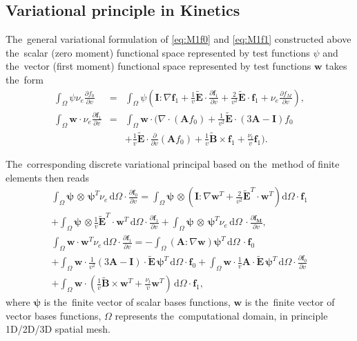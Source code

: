 \documentclass[preprint,12pt]{elsarticle}
\newcommand{\pdv}[2]{\frac{\partial{#1}}{\partial{#2}}}
\newcommand{\vect}[1]{\boldsymbol{#1}}
\newcommand{\matr}[1]{\mathbf{#1}}
\newcommand{\dI}{\text{d}}
\newcommand{\nue}{\nu_{e}}
\newcommand{\nutot}{\nu_{t}}
\newcommand{\vmag}{v}
\newcommand{\B}{\vect{B}}
\newcommand{\tE}{\vect{\tilde{E}}}
\newcommand{\tB}{\vect{\tilde{B}}}
\newcommand{\fM}{f_M}
\newcommand{\fzero}{f_0}
\newcommand{\vfzero}{\vect{f}_0}
\newcommand{\fone}{\vect{f}_1}
\newcommand{\MI}{\matr{I}}
\newcommand{\MA}{\matr{A}}
\newcommand{\intO}{\int_{\Omega}}
\newcommand{\Wzero}{\psi}
\newcommand{\Wone}{\matr{w}}
\newcounter{bla}
\begin{document}
\subsection{Variational principle in Kinetics}
The~general variational formulation of \eqref{eq:M1f0} and \eqref{eq:M1f1} 
constructed above the~scalar (zero moment) functional space
represented by test functions $\Wzero$ and the~vector
(first moment) functional space represented by test functions $\vect{w}$ 
takes the~form
\begin{eqnarray}
  \intO\Wzero\nue\pdv{\fzero}{\vmag} &=& 
  \intO\Wzero
  \left(\MI:\nabla\fone + 
  \frac{1}{\vmag}\tE\cdot\pdv{\fone}{\vmag}
  + \frac{2}{\vmag^2}\tE\cdot\fone + \nue \pdv{\fM}{\vmag}\right) , 
  \label{eq:M1hosf0_variational}\\
  \intO\vect{w}\cdot\nue\pdv{\fone}{\vmag} &=&
  \intO\vect{w}\cdot\Bigg(\nabla\cdot\left(\MA\fzero\right)  
  + \frac{1}{\vmag^2}\tE\cdot\left( 3\MA - \MI \right)\fzero
  \nonumber\\
  && 
  + \frac{1}{\vmag}\tE\cdot\pdv{}{\vmag}
  \left( \MA\fzero\right) + \frac{1}{\vmag}\tB\times\fone + 
  \frac{\nutot}{\vmag}\fone\Bigg) .
  \label{eq:M1hosf1_variational}
\end{eqnarray}

The~corresponding discrete variational principal based on the~method of 
finite elements then reads
\begin{multline}
  \intO\vect{\Wzero}\, \otimes\, \vect{\Wzero}^T 
  \nue\, \dI \Omega \cdot \pdv{\vfzero}{\vmag} = 
  \intO\vect{\Wzero}\, \otimes \left(\MI:\nabla\Wone^T + 
  \frac{2}{\vmag^2}\tE^T \cdot\Wone^T \right)\dI \Omega
  \cdot \fone \\
  + \intO\vect{\Wzero}\, \otimes
  \frac{1}{\vmag}\tE^T \cdot \Wone^T\, \dI \Omega 
  \cdot \pdv{\fone}{\vmag} + 
  \intO\vect{\Wzero}\, \otimes\, \vect{\Wzero}^T \nue\, \dI\Omega\,
  \cdot \pdv{\vect{\fM}}{\vmag} , 
  \label{eq:FEM1hosf0}
\end{multline}
\begin{multline}
  \intO\Wone \cdot \Wone^T \nue\, \dI\Omega \cdot 
  \pdv{\fone}{\vmag} =
  - \intO
  \left(\MA : \nabla\Wone\right)
  \vect{\Wzero}^T\, \dI \Omega\, 
  \cdot \vfzero \\
  + \intO\Wone \cdot 
  \frac{1}{\vmag^2} \left( 3\MA - \MI \right) \cdot \tE\,  
  \vect{\Wzero}^T\, \dI\Omega \cdot \vfzero 
  + \intO\Wone \cdot
  \frac{1}{\vmag} \MA \cdot \tE\, \vect{\Wzero}^T\, \dI \Omega 
  \cdot \pdv{\vfzero}{\vmag}\\
  + \intO\Wone \cdot
  \left(\frac{1}{\vmag}\tilde{\B}\times\Wone^T + 
  \frac{\nutot}{\vmag} \Wone^T\right)\, \dI\Omega 
  \cdot \fone ,
  \label{eq:FEM1hosf1}
\end{multline}
where $\vect{\Wzero}$ is the~finite vector of scalar bases functions, 
$\Wone$ is the~finite vector of vector bases functions,
$\Omega$ represents the~computational domain, in principle 1D/2D/3D 
spatial mesh. 
\end{document}
